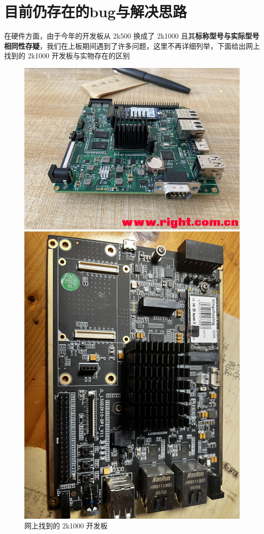 \chapter{目前仍存在的bug与解决思路}

在硬件方面，由于今年的开发板从 2k500 换成了 2k1000 且其\textbf{标称型号与实际型号相同性存疑}，我们在上板期间遇到了许多问题，这里不再详细列举，下面给出网上找到的 2k1000 开发板与实物存在的区别

\begin{figure}[htbp]
	\centering
	\begin{minipage}{0.49\linewidth}
		\centering
		\includegraphics[width=0.9\linewidth]{figs/2k1000pi.jpg}
		\caption{网上找到的 2k1000 开发板}
		\label{Board-Internet}
	\end{minipage}
	\begin{minipage}{0.49\linewidth}
		\centering
		\includegraphics[width=0.9\linewidth]{figs/2k10dp1v11.jpg}

\end{minipage}
\end{figure}
